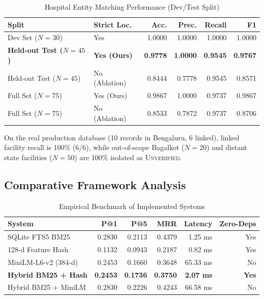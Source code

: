 \documentclass[conference]{IEEEtran}
\begin{document}
\begin{table}[htbp]
\caption{Hospital Entity Matching Performance (Dev/Test Split)}
\begin{center}
\begin{tabular}{llrrrr}
\toprule
\textbf{Split} & \textbf{Strict Loc.} & \textbf{Acc.} & \textbf{Prec.} & \textbf{Recall} & \textbf{F1} \\
\midrule
Dev Set ($N=30$) & Yes & 1.0000 & 1.0000 & 1.0000 & 1.0000 \\
\textbf{Held-out Test ($N=45$)} & \textbf{Yes (Ours)} & \textbf{0.9778} & \textbf{1.0000} & \textbf{0.9545} & \textbf{0.9767} \\
Held-out Test ($N=45$) & No (Ablation) & 0.8444 & 0.7778 & 0.9545 & 0.8571 \\
Full Set ($N=75$) & Yes (Ours) & 0.9867 & 1.0000 & 0.9737 & 0.9867 \\
Full Set ($N=75$) & No (Ablation) & 0.8533 & 0.7872 & 0.9737 & 0.8706 \\
\bottomrule
\end{tabular}
\end{center}
\end{table}

On the real production database (10 records in Bengaluru, 6 linked), linked facility recall is 100\% (6/6), while out-of-scope Bagalkot ($N=20$) and distant state facilities ($N=50$) are 100\% isolated as \textsc{Unverified}.

\subsection{Comparative Framework Analysis}

\begin{table}[htbp]
\caption{Empirical Benchmark of Implemented Systems}
\begin{center}
\begin{tabular}{lrrrrr}
\toprule
\textbf{System} & \textbf{P@1} & \textbf{P@5} & \textbf{MRR} & \textbf{Latency} & \textbf{Zero-Deps} \\
\midrule
SQLite FTS5 BM25 & 0.2830 & 0.2113 & 0.4379 & 1.25 ms & Yes \\
128-d Feature Hash & 0.1132 & 0.0943 & 0.2187 & 0.82 ms & Yes \\
MiniLM-L6-v2 (384-d) & 0.2453 & 0.1660 & 0.3648 & 65.33 ms & No \\
\textbf{Hybrid BM25 + Hash} & \textbf{0.2453} & \textbf{0.1736} & \textbf{0.3750} & \textbf{2.07 ms} & \textbf{Yes} \\
Hybrid BM25 + MiniLM & 0.2830 & 0.2226 & 0.4243 & 66.58 ms & No \\
\bottomrule
\end{tabular}
\end{center}
\end{table}
\end{document}
